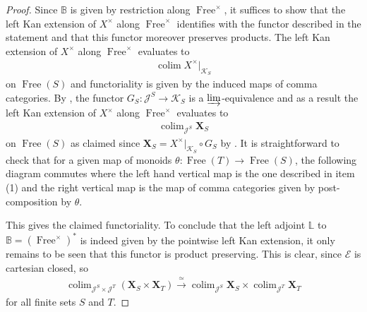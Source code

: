 \documentclass[12pt, reqno]{amsart}
\theoremstyle{plain}
\theoremstyle{definition}
\begin{document}
\begin{proof}
Since $\mathbb{B}$ is given by restriction along $\operatorname{Free}^\times$, it suffices to show that the left Kan extension of $X^\times$ along $\operatorname{Free}^\times$ identifies with the functor described in the statement and that this functor moreover preserves products. The left Kan extension of $X^\times$ along $\operatorname{Free}^\times$ evaluates to
\begin{align*}
\operatorname{colim} X^\times\vert_{\mathcal{K}_S}
\end{align*}
on $\operatorname{Free}(S)$ and functoriality is given by the induced maps of comma categories. By , the functor $G_S\colon \mathcal{J}^S\rightarrow \mathcal{K}_S$ is a $\varinjlim$-equivalence and as a result the left Kan extension of $X^\times$ along $\operatorname{Free}^\times$ evaluates to
\begin{align*}
\mathop{\operatorname{colim}}_{\mathcal{J}^S}\mathbf{X}_S
\end{align*}
on $\operatorname{Free}(S)$ as claimed since $\mathbf{X}_S= X^\times\vert_{\mathcal{K}_S}\circ G_S$ by . It is straightforward to check that for a given map of monoids $\theta\colon \operatorname{Free}(T)\rightarrow \operatorname{Free}(S)$, the following diagram commutes where the left hand vertical map is the one described in  item (1) and the right vertical map is the map of comma categories given by post-composition by $\theta$.
\begin{center}
\end{center}
This gives the claimed functoriality. To conclude that the left adjoint $\mathbb{L}$ to $\mathbb{B}=(\operatorname{Free}^\times)^*$ is indeed given by the pointwise left Kan extension, it only remains to be seen that this functor is product preserving. This is clear, since $\mathcal{E}$ is cartesian closed, so
\begin{align*}
\mathop{\operatorname{colim}}_{\mathcal{J}^S\times \mathcal{J}^T}(\mathbf{X}_S\times\mathbf{X}_T)\xrightarrow{\ \simeq\ } \mathop{\operatorname{colim}}_{\mathcal{J}^S}\mathbf{X}_S\times \mathop{\operatorname{colim}}_{\mathcal{J}^T}\mathbf{X}_T
\end{align*}
for all finite sets $S$ and $T$.
\end{proof}
\end{document}
